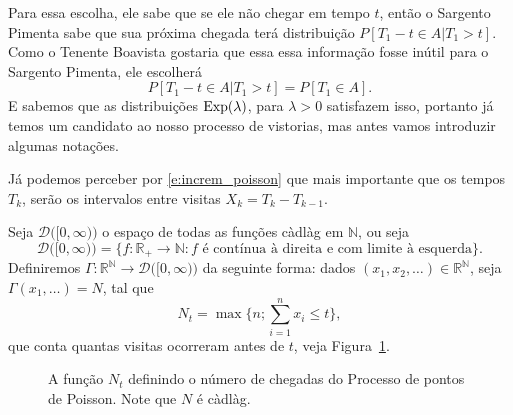 \begin{topics}
Para essa escolha, ele sabe que se ele não chegar em tempo $t$, então o Sargento Pimenta sabe que sua próxima chegada terá distribuição $P[T_1 - t \in A | T_1 > t]$.
Como o Tenente Boavista gostaria que essa essa informação fosse inútil para o Sargento Pimenta, ele escolherá
\begin{equation}
  P[T_1 - t \in A | T_1 > t] = P[T_1 \in A].
\end{equation}
E sabemos que as distribuições $\operatorname{Exp}(\lambda)$, para $\lambda > 0$ satisfazem isso, portanto já temos um candidato ao nosso processo de vistorias, mas antes vamos introduzir algumas notações.

Já podemos perceber por \eqref{e:increm_poisson} que mais importante que os tempos $T_k$, serão os intervalos entre visitas $X_k = T_k - T_{k-1}$.

Seja $\mathcal{D}\big( [0, \infty) \big)$ o espaço de todas as funções càdlàg em $\mathbb{N}$, ou seja
\begin{equation*}
  \mathcal{D}\big( [0, \infty) \big) = \big\{ f:\mathbb{R}_+ \to \mathbb{N}: f \text{ é contínua à direita e com limite à esquerda} \big\}.
\end{equation*}
Definiremos $\Gamma: \mathbb{R}^\mathbb{N} \to \mathcal{D}\big( [0, \infty) \big)$ da seguinte forma: dados $(x_1, x_2, \dots) \in \mathbb{R}^\mathbb{N}$, seja $\Gamma(x_1, \dots) = N$, tal que
\begin{equation}
  N_t = \max\{n; \sum_{i=1}^n x_i \leq t\},
\end{equation}
que conta quantas visitas ocorreram antes de $t$, veja Figura~\ref{f:ppp_reta}.

\begin{figure}[!ht]
  \centering
  \caption{A função $N_t$ definindo o número de chegadas do Processo de pontos de Poisson.
  Note que $N$ é càdlàg.\label{f:ppp_reta}}
\end{figure}


\end{topics}
